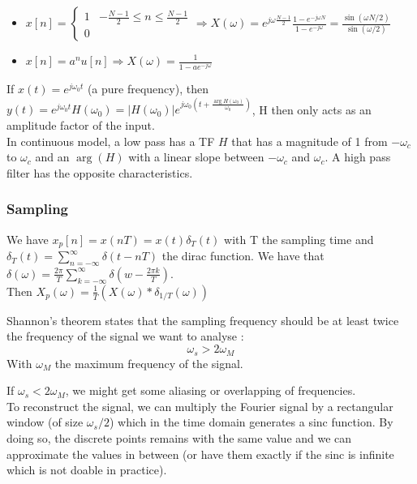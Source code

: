 \documentclass[../main.tex]{subfiles}
\begin{document}
\begin{itemize}
    \item $x[n] = \begin{cases}
        1 & -\frac{N-1}{2}\leq n \leq \frac{N-1}{2}\\
        0
    \end{cases} \Rightarrow X(\omega) = e^{j \omega \frac{N-1}{2}} \frac{1-e^{-j\omega N}}{1-e^{-j\omega}} = \frac{\sin(\omega N/2)}{\sin(\omega/2)}$
    \item $x[n] = a^n u[n] \Rightarrow X(\omega) = \frac{1}{1-ae^{-j\omega}}$
\end{itemize}

If $x(t) = e^{j\omega_0 t}$ (a pure frequency), then $y(t) = e^{j\omega_0 t} H(\omega_0) = \lvert H(\omega_0 )\rvert e^{j\omega_0 (t + \frac{\arg H(\omega_0)}{\omega_0})}$, H then only acts as an amplitude factor of the input.\\

In continuous model, a low pass has a TF $H$ that has a magnitude of 1 from $-\omega_c$ to $\omega_c$ and an $\arg(H)$ with a linear slope between $-\omega_c$ and $\omega_c$. A high pass filter has the opposite characteristics.\\

\subsubsection{Sampling}
 We have $x_p[n] = x(nT) = x(t) \delta_T(t)$ with T the sampling time and $\delta_T(t) = \sum_{n=-\infty}^\infty \delta(t-nT)$ the dirac function. We have that $\delta(\omega) = \frac{2\pi}{T} \sum_{k=-\infty}^\infty \delta(w-\frac{2\pi k}{T})$. \\
Then $X_p(\omega) = \frac{1}{T} (X(\omega) * \delta_{1/T}(\omega))$\\

\begin{theorem}
    Shannon's theorem states that the sampling frequency should be at least twice the frequency of the signal we want to analyse : \begin{equation}
        \omega_s > 2 \omega_M
    \end{equation}
    With $\omega_M$ the maximum frequency of the signal.
\end{theorem}

If $\omega_s<2\omega_M$, we might get some aliasing or overlapping of frequencies. \\
To reconstruct the signal, we can multiply the Fourier signal by a rectangular window (of size $\omega_s/2$) which in the time domain generates a sinc function. By doing so, the discrete points remains with the same value and we can approximate the values in between (or have them exactly if the sinc is infinite which is not doable in practice).\\
\end{document}

